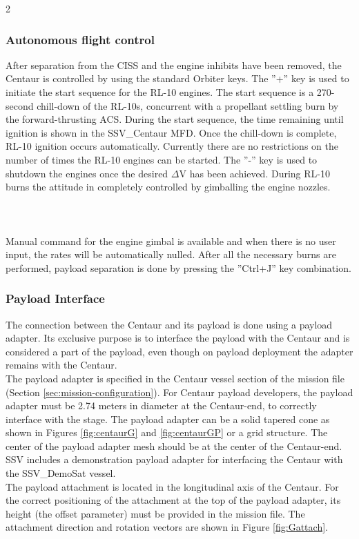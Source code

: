\documentclass[Space_Shuttle_Vessel_Manual.tex]{subfiles}
\begin{document}
\begin{multicols*}{2}
\subsubsection{Autonomous flight control}
After separation from the CISS and the engine inhibits have been removed, the Centaur is controlled by using the standard Orbiter keys. The ''+'' key is used to initiate the start sequence for the RL-10 engines. The start sequence is a 270-second chill-down of the RL-10s, concurrent with a propellant settling burn by the forward-thrusting ACS. During the start sequence, the time remaining until ignition is shown in the SSV\_Centaur MFD. Once the chill-down is complete, RL-10 ignition occurs automatically. Currently there are no restrictions on the number of times the RL-10 engines can be started. The ''-'' key is used to shutdown the engines once the desired $\Delta$V has been achieved. During RL-10 burns the attitude in completely controlled by gimballing the engine nozzles.
\\
\\
\\
\\
Manual command for the engine gimbal is available and when there is no user input, the rates will be automatically nulled. After all the necessary burns are performed, payload separation is done by pressing the ''Ctrl+J'' key combination.

\subsubsection{Payload Interface}
The connection between the Centaur and its payload is done using a payload adapter. Its exclusive purpose is to interface the payload with the Centaur and is considered a part of the payload, even though on payload deployment the adapter remains with the Centaur.\\
The payload adapter is specified in the Centaur vessel section of the mission file (Section \ref{sec:mission-configuration}). For Centaur payload developers, the payload adapter must be 2.74 meters in diameter at the Centaur-end, to correctly interface with the stage. The payload adapter can be a solid tapered cone as shown in Figures \ref{fig:centaurG} and \ref{fig:centaurGP} or a grid structure. The center of the payload adapter mesh should be at the center of the Centaur-end. SSV includes a demonstration payload adapter for interfacing the Centaur with the SSV\_DemoSat vessel.\\
The payload attachment is located in the longitudinal axis of the Centaur. For the correct positioning of the attachment at the top of the payload adapter, its height (the offset parameter) must be provided in the mission file. The attachment direction and rotation vectors are shown in Figure \ref{fig:Gattach}.


\end{multicols*}
\end{document}
